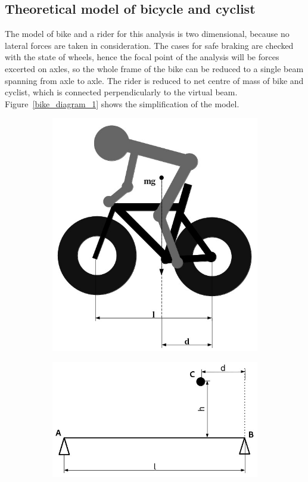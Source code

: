 \documentclass[12pt]{article}
\begin{document}
\subsection{Theoretical model of bicycle and cyclist}
The model of bike and a rider for this analysis is two dimensional, because no lateral forces are taken in 
consideration. The cases for safe braking are checked with the state of wheels, hence the focal point of the 
analysis will be forces excerted on axles, so the whole frame of the bike can be reduced to a single beam 
spanning from axle to axle. The rider is reduced to net centre of mass of bike and cyclist, which is connected
perpendicularly to the virtual beam. Figure~\ref{bike_diagram_1} shows the simplification of the model.
\begin{figure}[h]
\caption{}
\centering
\begin{subfigure}[b]{0.4\linewidth}
\includegraphics[width=\linewidth]{bike_static_model_bike}
\label{fig:bike_diagram}%
\caption{}
\end{subfigure}
\begin{subfigure}[b]{0.4\linewidth}
\includegraphics[width=\linewidth]{bike_static_model_simplified}

\end{subfigure}
\end{figure}
\end{document}
